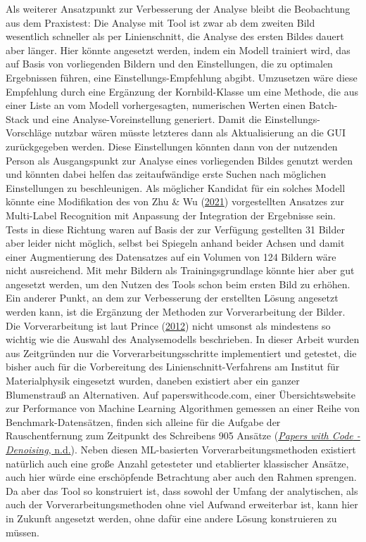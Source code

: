 \documentclass[
  12pt,
  openany]{book}
\begin{document}
Als weiterer Ansatzpunkt zur Verbesserung der Analyse bleibt die Beobachtung aus dem Praxistest: Die Analyse mit Tool ist zwar ab dem zweiten Bild wesentlich schneller als per Linienschnitt, die Analyse des ersten Bildes dauert aber länger. Hier könnte angesetzt werden, indem ein Modell trainiert wird, das auf Basis von vorliegenden Bildern und den Einstellungen, die zu optimalen Ergebnissen führen, eine Einstellungs-Empfehlung abgibt. Umzusetzen wäre diese Empfehlung durch eine Ergänzung der Kornbild-Klasse um eine Methode, die aus einer Liste an vom Modell vorhergesagten, numerischen Werten einen Batch-Stack und eine Analyse-Voreinstellung generiert. Damit die Einstellungs-Vorschläge nutzbar wären müsste letzteres dann als Aktualisierung an die GUI zurückgegeben werden. Diese Einstellungen könnten dann von der nutzenden Person als Ausgangspunkt zur Analyse eines vorliegenden Bildes genutzt werden und könnten dabei helfen das zeitaufwändige erste Suchen nach möglichen Einstellungen zu beschleunigen. Als möglicher Kandidat für ein solches Modell könnte eine Modifikation des von Zhu \& Wu (\protect\hyperlink{ref-zhuResidualAttentionSimple2021}{2021}) vorgestellten Ansatzes zur Multi-Label Recognition mit Anpassung der Integration der Ergebnisse sein. Tests in diese Richtung waren auf Basis der zur Verfügung gestellten 31 Bilder aber leider nicht möglich, selbst bei Spiegeln anhand beider Achsen und damit einer Augmentierung des Datensatzes auf ein Volumen von 124 Bildern wäre nicht ausreichend. Mit mehr Bildern als Trainingsgrundlage könnte hier aber gut angesetzt werden, um den Nutzen des Tools schon beim ersten Bild zu erhöhen. \newline
Ein anderer Punkt, an dem zur Verbesserung der erstellten Lösung angesetzt werden kann, ist die Ergänzung der Methoden zur Vorverarbeitung der Bilder. Die Vorverarbeitung ist laut Prince (\protect\hyperlink{ref-princePartIVPreprocessing2012}{2012}) nicht umsonst als mindestens so wichtig wie die Auswahl des Analysemodells beschrieben. In dieser Arbeit wurden aus Zeitgründen nur die Vorverarbeitungsschritte implementiert und getestet, die bisher auch für die Vorbereitung des Linienschnitt-Verfahrens am Institut für Materialphysik eingesetzt wurden, daneben existiert aber ein ganzer Blumenstrauß an Alternativen. Auf paperswithcode.com, einer Übersichtswebsite zur Performance von Machine Learning Algorithmen gemessen an einer Reihe von Benchmark-Datensätzen, finden sich alleine für die Aufgabe der Rauschentfernung zum Zeitpunkt des Schreibens 905 Ansätze (\protect\hyperlink{ref-PapersCodeDenoising}{\emph{Papers with {Code} - {Denoising}}, n.d.}). Neben diesen ML-basierten Vorverarbeitungsmethoden existiert natürlich auch eine große Anzahl getesteter und etablierter klassischer Ansätze, auch hier würde eine erschöpfende Betrachtung aber auch den Rahmen sprengen.
Da aber das Tool so konstruiert ist, dass sowohl der Umfang der analytischen, als auch der Vorverarbeitungsmethoden ohne viel Aufwand erweiterbar ist, kann hier in Zukunft angesetzt werden, ohne dafür eine andere Lösung konstruieren zu müssen.
\end{document}
